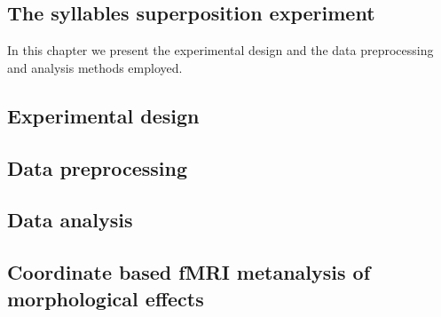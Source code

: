 \begin{fullwidth}
\chapter{\label{ch:super_methods}
The syllables superposition experiment}
\end{fullwidth}

\begin{chabstract}

In this chapter we present the experimental design and the data preprocessing and analysis methods employed.

\end{chabstract}


\section{Experimental design}
%

\section{Data preprocessing}

\section{Data analysis}


\section{Coordinate based fMRI metanalysis of morphological effects}


